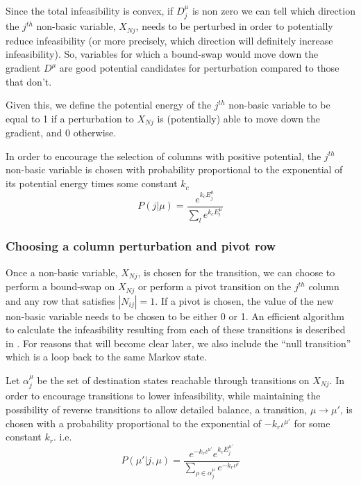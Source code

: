 \documentclass{article}
\begin{document}
Since the total infeasibility is convex, if $D^\mu_j$ is non zero we can tell which direction the $j^{th}$ non-basic variable, $X_{Nj}$, needs to be perturbed in order to potentially reduce infeasibility (or more precisely, which direction will definitely increase infeasibility). So, variables for which a bound-swap would move down the gradient $D^\mu$ are good potential candidates for perturbation compared to those that don't.

Given this, we define the potential energy of the $j^{th}$ non-basic variable to be equal to 1 if a perturbation to $X_{Nj}$ is (potentially) able to move down the gradient, and 0 otherwise.

In order to encourage the selection of columns with positive potential, the $j^{th}$ non-basic variable is chosen with probability proportional to the exponential of its potential energy times some constant $k_c$
\begin{equation}
P(j|\mu) = \frac{e^{k_cE^\mu_j}}{\sum_l e^{k_cE^\mu_l}}
\label{columnChoice}
\end{equation}

\subsubsection{Choosing a column perturbation and pivot row}

Once a non-basic variable, $X_{Nj}$, is chosen for the transition, we can choose to perform a bound-swap on $X_{Nj}$ or perform a pivot transition on the $j^{th}$ column and any row that satisfies $|N_{ij}|=1$. If a pivot is chosen, the value of the new non-basic variable needs to be chosen to be either 0 or 1. An efficient algorithm to calculate the infeasibility resulting from each of these transitions is described in \cite[Chapter~9]{maros2002computational}. For reasons that will become clear later, we also include the ``null transition'' which is a loop back to the same Markov state.

Let $\alpha^\mu_j$ be the set of destination states reachable through transitions on $X_{Nj}$. In order to encourage transitions to lower infeasibility, while maintaining the possibility of reverse transitions to allow detailed balance, a transition, $\mu\to\mu'$, is chosen with a probability proportional to the exponential of $-k_r\iota^{\mu'}$ for some constant $k_r$. i.e.
\begin{equation}
P(\mu'|j,\mu) = 
\frac{e^{-k_r\iota^{\mu'}}e^{k_cE^{\mu'}_j} }
	{\sum_{\rho \in \alpha^\mu_j}  e^{-k_r\iota^\rho}}
\label{pTransitionGivenJ}
\end{equation}
\end{document}
